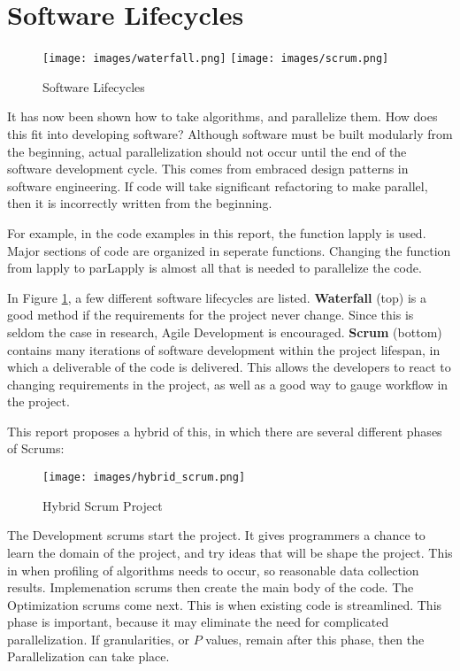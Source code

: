 
\section{Software Lifecycles}

\begin{figure}[h]
	\begin{center}
		\texttt{[image: images/waterfall.png]}
		\texttt{[image: images/scrum.png]}
		\caption{Software Lifecycles} 
		\label{lifecycles}
	\end{center}
\end{figure}

It has now been shown how to take algorithms, and parallelize them. How does this fit into developing software?
Although software must be built modularly from the beginning, actual parallelization should not occur until the 
end of the software development cycle. This comes from embraced design patterns in software engineering.
If code will take significant refactoring to make parallel, then it is incorrectly written from the beginning.

For example, in the code examples in this report, the function lapply is used. Major sections of code are organized in seperate functions. Changing the function from lapply to parLapply is almost all that is needed
to parallelize the code. 

In Figure \ref{lifecycles}, a few different software lifecycles are listed. \textbf{Waterfall} (top) is a good method if
the requirements for the project never change. Since this is seldom the case in research, Agile 
Development is encouraged. \textbf{Scrum} (bottom) contains many iterations of software development within
the project lifespan, in which a deliverable of the code is delivered. This allows the developers to react to 
changing requirements in the project, as well as a good way to gauge workflow in the project.

This report proposes a hybrid of this, in which there are several different phases of Scrums:

\begin{figure}[h]
	\begin{center}
		\texttt{[image: images/hybrid\_scrum.png]}
		\caption{Hybrid Scrum Project} 
		\label{hybrid_scrums}
	\end{center}
\end{figure}

The Development scrums start the project. It gives programmers a chance to learn the domain of the project, and try ideas that will be shape the project. This in when profiling of algorithms needs to occur, so reasonable 
data collection results. Implemenation scrums then create the main body of the code. The 
Optimization scrums come next. This is when existing code is streamlined. This phase is important, because it may eliminate the need for complicated parallelization. If granularities, or $P$ values, remain after this 
phase, then the Parallelization can take place.